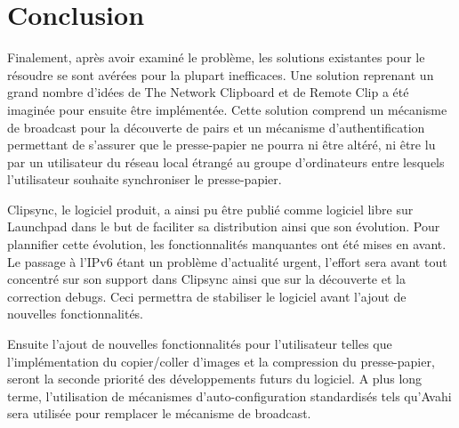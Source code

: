 \chapter*{Conclusion}
\renewcommand{\leftmark}{CONCLUSION}
Finalement, après avoir examiné le problème, les solutions existantes
pour le résoudre se sont avérées pour la plupart inefficaces. Une solution
reprenant un grand nombre d'idées de The Network Clipboard et de Remote
Clip a été imaginée pour ensuite être implémentée. Cette solution
comprend un mécanisme de broadcast pour la découverte de pairs et un mécanisme
d'authentification permettant de s'assurer que le presse-papier ne pourra ni
être altéré, ni être lu par un utilisateur du réseau local étrangé au groupe
d'ordinateurs entre lesquels l'utilisateur souhaite synchroniser le
presse-papier.

Clipsync, le logiciel produit, a ainsi pu être publié comme logiciel libre sur
Launchpad dans le but de faciliter sa distribution ainsi que son évolution.
Pour plannifier cette évolution, les fonctionnalités manquantes ont été mises
en avant.
Le passage à l'IPv6 étant un problème d'actualité urgent, l'effort
sera avant tout concentré sur son support dans Clipsync ainsi que sur la
découverte et la correction debugs. Ceci permettra de stabiliser le logiciel
avant l'ajout de nouvelles fonctionnalités.

Ensuite l'ajout de nouvelles fonctionnalités pour l'utilisateur telles que
l'implémentation du copier/coller d'images et la compression du presse-papier,
seront la seconde priorité des développements futurs du logiciel.
A plus long terme, l'utilisation de mécanismes d'auto-configuration
standardisés tels qu'Avahi sera utilisée pour remplacer le mécanisme
de broadcast.